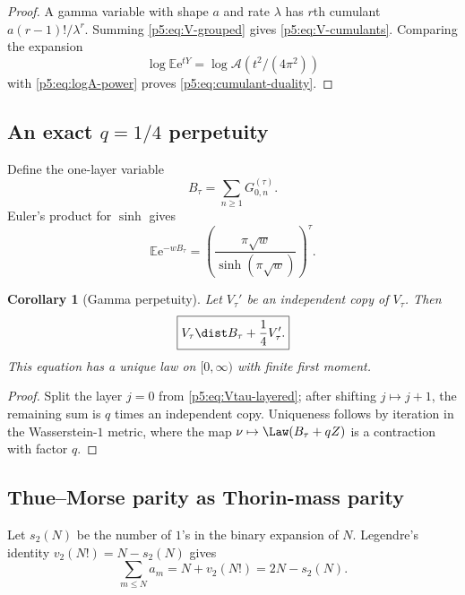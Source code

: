 \documentclass[11pt]{article}
\numberwithin{equation}{section}
\newtheorem{corollary}[theorem]{Corollary}
\theoremstyle{definition}
\theoremstyle{remark}
\newcommand{\E}{\mathbb E}
\newcommand{\e}{\mathrm e}
\begin{document}
\begin{proof}
A gamma variable with shape $a$ and rate $\lambda$ has $r$th cumulant
$a(r-1)!/\lambda^r$.  Summing \cref{p5:eq:V-grouped} gives
\cref{p5:eq:V-cumulants}.  Comparing the expansion
\[
 \log\E\e^{tY}=\log\mathcal A(t^2/(4\pi^2))
\]
with \cref{p5:eq:logA-power} proves \cref{p5:eq:cumulant-duality}.
\end{proof}

\subsection{An exact $q=1/4$ perpetuity}

Define the one-layer variable
\begin{equation}\label{p5:eq:Btau}
 B_\tau=\sum_{n\ge1}G_{0,n}^{(\tau)}.
\end{equation}
Euler's product for $\sinh$ gives
\begin{equation}\label{p5:eq:B-LT}
 \E\e^{-wB_\tau}
 =\left(\frac{\pi\sqrt w}{\sinh(\pi\sqrt w)}\right)^\tau.
\end{equation}

\begin{corollary}[Gamma perpetuity]\label{p5:cor:perpetuity}
Let $V_\tau'$ be an independent copy of $V_\tau$.  Then
\begin{equation}\label{p5:eq:perpetuity}
 \boxed{V_\tau\dist B_\tau+\frac14V_\tau'.}
\end{equation}
This equation has a unique law on $[0,\infty)$ with finite first moment.
\end{corollary}

\begin{proof}
Split the layer $j=0$ from \cref{p5:eq:Vtau-layered}; after shifting
$j\mapsto j+1$, the remaining sum is $q$ times an independent copy.  Uniqueness
follows by iteration in the Wasserstein-$1$ metric, where the map
$\nu\mapsto\Law(B_\tau+qZ)$ is a contraction with factor $q$.
\end{proof}

\subsection{Thue--Morse parity as Thorin-mass parity}

Let $s_2(N)$ be the number of $1$'s in the binary expansion of $N$.
Legendre's identity $v_2(N!)=N-s_2(N)$ gives
\begin{equation}\label{p5:eq:cumulative-a}
 \sum_{m\le N}a_m=N+v_2(N!)=2N-s_2(N).
\end{equation}
\end{document}
